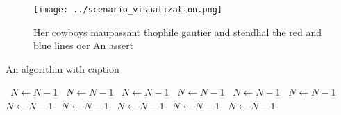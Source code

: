 \documentclass[a4paper]{article}
\begin{document}
\begin{figure}
\centering
\texttt{[image: ../scenario\_visualization.png]}
\caption{Her cowboys maupassant thophile gautier and stendhal the red and blue lines oer An assert
}
\end{figure}
 
\begin{algorithm}
\caption{An algorithm with caption}
\begin{algorithmic}
\    \State $N \gets N - 1$
\    \State $N \gets N - 1$
\    \State $N \gets N - 1$
\    \State $N \gets N - 1$
\    \State $N \gets N - 1$
\    \State $N \gets N - 1$
\    \State $N \gets N - 1$
\    \State $N \gets N - 1$
\    \State $N \gets N - 1$
\    \State $N \gets N - 1$
\    \State $N \gets N - 1$
\EndWhile
\end{algorithmic}
\end{algorithm}
\end{document}
